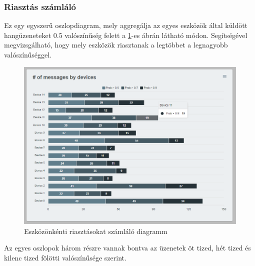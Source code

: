 \subsubsection{Riasztás számláló}
Ez egy egyszerű oszlopdiagram, mely aggregálja az egyes eszközök által küldött hangüzeneteket 0.5 valószínűség felett a \ref{fig:dashboard-devices-column}-es ábrán látható módon.
Segítségével megvizsgálható, hogy mely eszközök riasztanak a legtöbbet a legnagyobb valószínűséggel.
\begin{figure}[!ht]
    \centering
    \includegraphics[width=150mm, keepaspectratio]{figures/dashboard-column-devices.png}
    \caption{Eszközönkénti riasztásokat számláló diagramm}
    \label{fig:dashboard-devices-column}
\end{figure}

Az egyes oszlopok három részre vannak bontva az üzenetek öt tized, hét tized és kilenc tized fölötti valószínűsége szerint. 
\newpage
